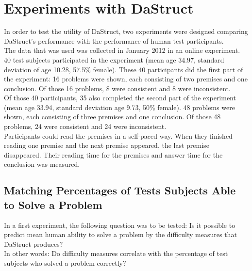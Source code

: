 \documentclass[hidelinks]{scrartcl}
\begin{document}
\section{Experiments with DaStruct}
In order to test the utility of DaStruct, two experiments were designed comparing DaStruct's performance with the performance of human test participants. \\
The data that was used was collected in January 2012 in an online experiment. 40 test subjects participated in the experiment (mean  age 34.97, standard deviation of age 10.28, 57.5\% female).
These 40 participants did the first part of the experiment: 16 problems were shown, each consisting of two \gls{premise}s and one conclusion. Of those 16 problems, 8 were consistent and 8 were inconsistent. \\
Of those 40 participants, 35 also completed the second part of the experiment (mean age 33.94, standard deviation age 9.73, 50\% female). 48 problems were shown, each consisting of three \gls{premise}s and one conclusion. Of those 48 problems, 24 were consistent and 24 were inconsistent. \\
Participants could read the \gls{premise}s in a self-paced way. When they finished reading one \gls{premise} and the next \gls{premise} appeared, the last \gls{premise} disappeared. Their reading time for the \gls{premise}s and answer time for the conclusion was measured.

\subsection{Matching Percentages of Tests Subjects Able to Solve a Problem}
In a first experiment, the following question was to be tested: Is it possible to predict mean human ability to solve a problem by the difficulty measures that DaStruct produces? \\
In other words: Do difficulty measures correlate with the percentage of test subjects who solved a problem correctly?
\end{document}
